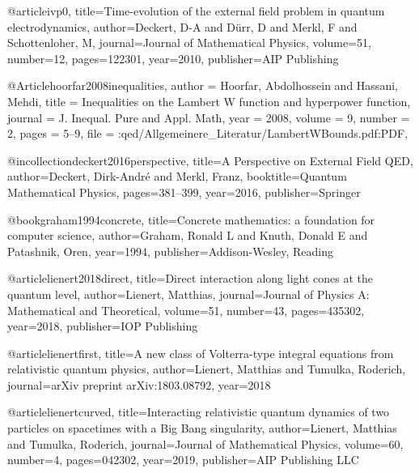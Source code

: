 @article{ivp0,
  title={Time-evolution of the external field problem in quantum electrodynamics},
  author={Deckert, D-A and D{\"u}rr, D and Merkl, F and Schottenloher, M},
  journal={Journal of Mathematical Physics},
  volume={51},
  number={12},
  pages={122301},
  year={2010},
  publisher={AIP Publishing}
}


@Article{hoorfar2008inequalities,
  author  = {Hoorfar, Abdolhossein and Hassani, Mehdi},
  title   = {Inequalities on the Lambert W function and hyperpower function},
  journal = {J. Inequal. Pure and Appl. Math},
  year    = {2008},
  volume  = {9},
  number  = {2},
  pages   = {5--9},
  file    = {:qed/Allgemeinere_Literatur/LambertWBounds.pdf:PDF},
}



@incollection{deckert2016perspective,
  title={A Perspective on External Field QED},
  author={Deckert, Dirk-Andr{\'e} and Merkl, Franz},
  booktitle={Quantum Mathematical Physics},
  pages={381--399},
  year={2016},
  publisher={Springer}
}

@book{graham1994concrete,
  title={Concrete mathematics: a foundation for computer science},
  author={Graham, Ronald L and Knuth, Donald E and Patashnik, Oren},
  year={1994},
  publisher={Addison-Wesley, Reading}
}

@article{lienert2018direct,
  title={Direct interaction along light cones at the quantum level},
  author={Lienert, Matthias},
  journal={Journal of Physics A: Mathematical and Theoretical},
  volume={51},
  number={43},
  pages={435302},
  year={2018},
  publisher={IOP Publishing}
}



@article{lienertfirst,
  title={A new class of Volterra-type integral equations from relativistic quantum physics},
  author={Lienert, Matthias and Tumulka, Roderich},
  journal={arXiv preprint arXiv:1803.08792},
  year={2018}
}

@article{lienertcurved,
  title={Interacting relativistic quantum dynamics of two particles on spacetimes with a Big Bang singularity},
  author={Lienert, Matthias and Tumulka, Roderich},
  journal={Journal of Mathematical Physics},
  volume={60},
  number={4},
  pages={042302},
  year={2019},
  publisher={AIP Publishing LLC}
}

